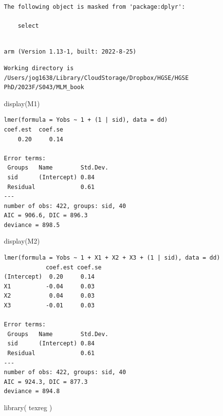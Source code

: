 \documentclass[
  letterpaper,
  DIV=11,
  numbers=noendperiod]{scrreprt}
\newenvironment{Shaded}{\begin{snugshade}}{\end{snugshade}}
\newcommand{\FunctionTok}[1]{\textcolor[rgb]{0.02,0.16,0.49}{#1}}
\newcommand{\NormalTok}[1]{\textcolor[rgb]{0.00,0.44,0.13}{#1}}
\begin{document}
\begin{verbatim}
The following object is masked from 'package:dplyr':

    select
\end{verbatim}

\begin{verbatim}

arm (Version 1.13-1, built: 2022-8-25)
\end{verbatim}

\begin{verbatim}
Working directory is /Users/jog1638/Library/CloudStorage/Dropbox/HGSE/HGSE PhD/2023F/S043/MLM_book
\end{verbatim}

\begin{Shaded}
\begin{Highlighting}[]
\FunctionTok{display}\NormalTok{(M1)}
\end{Highlighting}
\end{Shaded}

\begin{verbatim}
lmer(formula = Yobs ~ 1 + (1 | sid), data = dd)
coef.est  coef.se 
    0.20     0.14 

Error terms:
 Groups   Name        Std.Dev.
 sid      (Intercept) 0.84    
 Residual             0.61    
---
number of obs: 422, groups: sid, 40
AIC = 906.6, DIC = 896.3
deviance = 898.5 
\end{verbatim}

\begin{Shaded}
\begin{Highlighting}[]
\FunctionTok{display}\NormalTok{(M2)}
\end{Highlighting}
\end{Shaded}

\begin{verbatim}
lmer(formula = Yobs ~ 1 + X1 + X2 + X3 + (1 | sid), data = dd)
            coef.est coef.se
(Intercept)  0.20     0.14  
X1          -0.04     0.03  
X2           0.04     0.03  
X3          -0.01     0.03  

Error terms:
 Groups   Name        Std.Dev.
 sid      (Intercept) 0.84    
 Residual             0.61    
---
number of obs: 422, groups: sid, 40
AIC = 924.3, DIC = 877.3
deviance = 894.8 
\end{verbatim}

\begin{Shaded}
\begin{Highlighting}[]
\FunctionTok{library}\NormalTok{( texreg )}
\end{Highlighting}
\end{Shaded}
\end{document}
